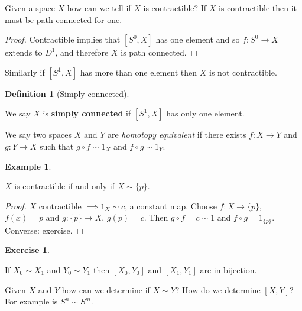 \documentclass[10pt,]{book}
\newcommand{\terminology}[1]{\textbf{#1}}
\theoremstyle{plain}
\theoremstyle{definition}
\newtheorem{definition}[theorem]{Definition}
\newtheorem{example}[theorem]{Example}
\newtheorem{exercise}[theorem]{Exercise}
\numberwithin{equation}{section}
\begin{document}
            Given a space \(X\) how can we tell if \(X\) is contractible? If \(X\) is
            contractible then it must be path connected for one.

            \begin{proof}

              Contractible implies that \([S^0, X]\) has one element and so \(f \colon
              S^0 \to X\) extends to \(D^1\), and therefore \(X\) is path connected. \end{proof}


            Similarly if \([S^1, X]\) has more than one element then \(X\) is not
            contractible.
\begin{definition}[Simply connected]\label{definition-3}

              We say \(X\) is \terminology{simply connected} if \([S^1, X]\) has only one
              element.

              We say two spaces \(X\) and \(Y\) are \emph{homotopy equivalent} if there
              exists \(f\colon X \to Y\) and \(g\colon Y \to X\) such that \(g\circ f
              \sim 1_X\) and \(f\circ g \sim 1_Y\).
            \end{definition}
\begin{example}\label{example-2}

              \(X\) is contractible if and only if \(X \sim \{p\}\).
\begin{proof}
\(X\) contractible \(\implies 1_X \sim c\), a constant map.
              Choose \(f\colon X \to \{p\}\), \(f(x) = p\) and \(g\colon\{p\} \to X\),
              \(g(p) = c\). Then \(g\circ f = c \sim 1\) and \(f\circ g = 1_{\{p\}}\).
              Converse: exercise.
            \end{proof}
\end{example}
\begin{exercise}\label{exercise-1}

              If \(X_0 \sim X_1\) and \(Y_0 \sim Y_1\) then \([X_0, Y_0]\) and
              \([X_1, Y_1]\) are in bijection.
            \end{exercise}
\par

            Given \(X\) and \(Y\) how can we determine if \(X\sim Y\)?
            How do we determine \([X,Y]\)?
            For example is \(S^n \sim S^m\).
\typeout{************************************************}
\typeout{************************************************}
\end{document}
